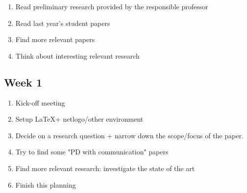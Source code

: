 \documentclass[english]{article}
\begin{document}
\begin{enumerate}
\item Read preliminary research provided by the responsible professor
\item Read last year's student papers
\item Find more relevant papers
\item Think about interesting relevant research
\end{enumerate}

\subsection*{Week 1}

\begin{enumerate}
\item Kick-off meeting
\item Setup \LaTeX + netlogo/other  environment
\item Decide on a research question + narrow down the scope/focus of the paper.
\item Try to find some "PD with communication" papers
\item Find more relevant research: investigate the state of the art
\item Finish this planning
\end{enumerate}





\listoftodos
\end{document}
